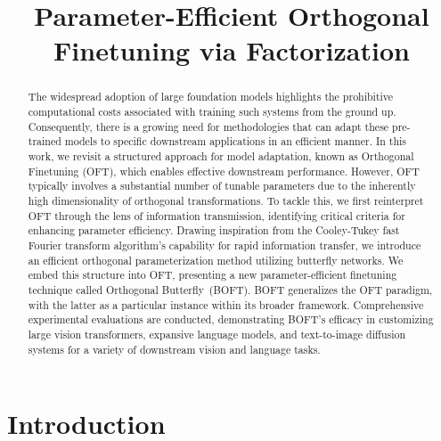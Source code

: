 \title{Parameter-Efficient Orthogonal Finetuning via Factorization}

\begin{abstract}
The widespread adoption of large foundation models highlights the prohibitive computational costs associated with training such systems from the ground up. Consequently, there is a growing need for methodologies that can adapt these pre-trained models to specific downstream applications in an efficient manner. In this work, we revisit a structured approach for model adaptation, known as Orthogonal Finetuning (OFT), which enables effective downstream performance. However, OFT typically involves a substantial number of tunable parameters due to the inherently high dimensionality of orthogonal transformations. To tackle this, we first reinterpret OFT through the lens of information transmission, identifying critical criteria for enhancing parameter efficiency. Drawing inspiration from the Cooley-Tukey fast Fourier transform algorithm’s capability for rapid information transfer, we introduce an efficient orthogonal parameterization method utilizing butterfly networks. We embed this structure into OFT, presenting a new parameter-efficient finetuning technique called Orthogonal Butterfly~(BOFT). BOFT generalizes the OFT paradigm, with the latter as a particular instance within its broader framework. Comprehensive experimental evaluations are conducted, demonstrating BOFT’s efficacy in customizing large vision transformers, expansive language models, and text-to-image diffusion systems for a variety of downstream vision and language tasks.
\end{abstract}

\section{Introduction}


